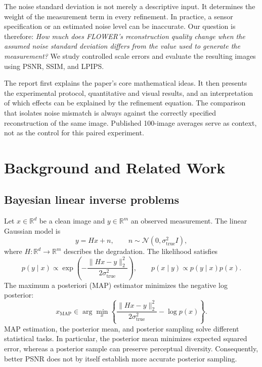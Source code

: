 \documentclass[10pt,letterpaper]{article}
\newcommand{\R}{\mathbb{R}}
\newcommand{\N}{\mathcal{N}}
\newcommand{\st}{\sigma_{\mathrm{true}}}
\begin{document}
The noise standard deviation is not merely a descriptive input. It determines the weight of the measurement term in every refinement. In practice, a sensor specification or an estimated noise level can be inaccurate. Our question is therefore: \emph{How much does FLOWER's reconstruction quality change when the assumed noise standard deviation differs from the value used to generate the measurement?} We study controlled scale errors and evaluate the resulting images using PSNR, SSIM, and LPIPS.

The report first explains the paper's core mathematical ideas. It then presents the experimental protocol, quantitative and visual results, and an interpretation of which effects can be explained by the refinement equation. The comparison that isolates noise mismatch is always against the correctly specified reconstruction of the same image. Published 100-image averages serve as context, not as the control for this paired experiment.

\section{Background and Related Work}
\subsection{Bayesian linear inverse problems}
Let $x\in\R^d$ be a clean image and $y\in\R^m$ an observed measurement. The linear Gaussian model is
\begin{equation}
 y=Hx+n,\qquad n\sim\N(0,\st^2 I),
 \label{eq:model}
\end{equation}
where $H:\R^d\to\R^m$ describes the degradation. The likelihood satisfies
\begin{equation}
 p(y\mid x)\propto\exp\!\left(-\frac{\|Hx-y\|_2^2}{2\st^2}\right),
 \qquad p(x\mid y)\propto p(y\mid x)p(x).
\end{equation}
The maximum a posteriori (MAP) estimator minimizes the negative log posterior:
\begin{equation}
 x_{\mathrm{MAP}}\in\arg\min_x\left\{
 \frac{\|Hx-y\|_2^2}{2\st^2}-\log p(x)\right\}.
\end{equation}
MAP estimation, the posterior mean, and posterior sampling solve different statistical tasks. In particular, the posterior mean minimizes expected squared error, whereas a posterior sample can preserve perceptual diversity. Consequently, better PSNR does not by itself establish more accurate posterior sampling.
\end{document}
